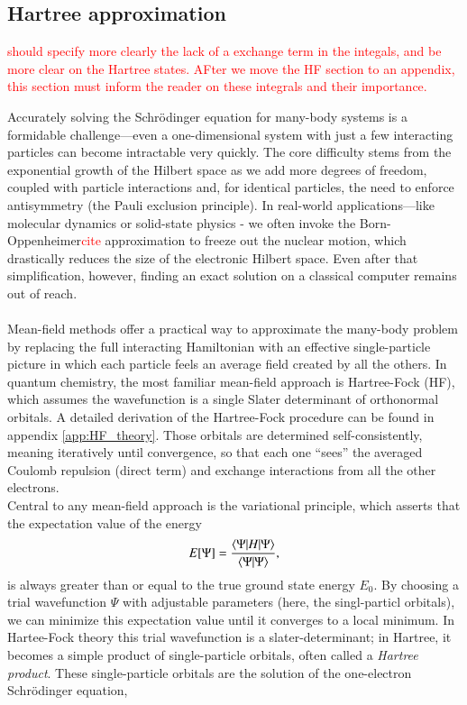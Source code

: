 \documentclass{subfiles}
\begin{document}
\subsection{Hartree approximation}\label{sec:bipartite_hartree}
\textcolor{red}{should specify more clearly the lack of a exchange term in the integals, and be more clear on the Hartree states. AFter we move the HF section to an appendix, this section must inform the reader on these integrals and their importance.  }

Accurately solving the Schrödinger equation for many-body systems is a formidable challenge—even a one-dimensional system with just a few interacting particles can become intractable very quickly. The core difficulty stems from the exponential growth of the Hilbert space as we add more degrees of freedom, coupled with particle interactions and, for identical particles, the need to enforce antisymmetry (the Pauli exclusion principle). In real-world applications—like molecular dynamics or solid-state physics - we often invoke the Born-Oppenheimer\textcolor{red}{cite} approximation to freeze out the nuclear motion, which drastically reduces the size of the electronic Hilbert space. Even after that simplification, however, finding an exact solution on a classical computer remains out of reach.
\\ \\ 
Mean-field methods offer a practical way to approximate the many-body problem by replacing the full interacting Hamiltonian with an effective single-particle picture in which each particle feels an average field created by all the others. In quantum chemistry, the most familiar mean-field approach is Hartree-Fock (HF), which assumes the wavefunction is a single Slater determinant of orthonormal orbitals. A detailed derivation of the Hartree-Fock procedure can be found in appendix \ref{app:HF_theory}. Those orbitals are determined self-consistently, meaning iteratively until convergence, so that each one “sees” the averaged Coulomb repulsion (direct term) and exchange interactions from all the other electrons.
\\
Central to any mean-field approach is the variational principle, which asserts that the expectation value of the energy
\begin{equation}
    E[\Psi] = \frac{\braket{\Psi|H|\Psi}}{\braket{\Psi|\Psi}}\label{eq:variational_principle},
\end{equation}
is always greater than or equal to the true ground state energy $E_0$. By choosing a trial wavefunction $\Psi$ with adjustable parameters (here, the singl-particl orbitals), we can minimize this expectation value until it converges to a local minimum. In Hartee-Fock theory this trial wavefunction is a slater-determinant; in Hartree, it becomes a simple product of single-particle orbitals, often called a \emph{Hartree product}. These single-particle orbitals are the solution of the one-electron Schrödinger equation, 
\end{document}
